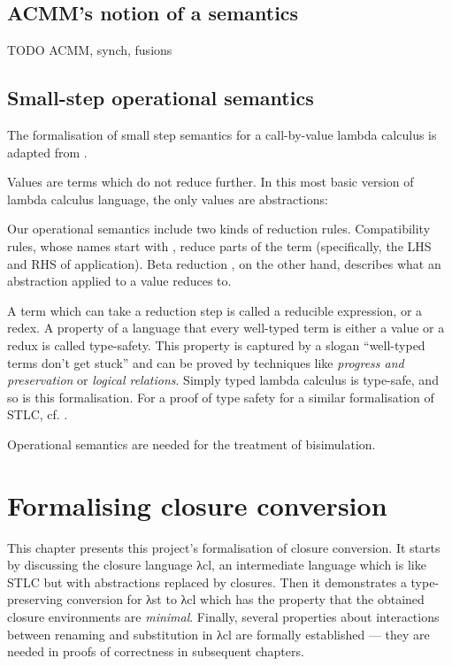 \documentclass[bsc,frontabs,oneside,singlespacing,parskip,deptreport]{infthesis}
\theoremstyle{definition}
\theoremstyle{lemma}
\begin{document}


\section{ACMM's notion of a semantics}

TODO ACMM, synch, fusions

\section{Small-step operational semantics}

The formalisation of small step semantics for a call-by-value lambda
calculus is adapted from \cite{DBLP:conf/sbmf/Wadler18}.

Values are terms which do not reduce further. In this most basic
version of lambda calculus language, the only values are abstractions:


Our operational semantics include two kinds of reduction rules. Compatibility rules, whose
names start with , reduce parts of the term (specifically, the LHS
and RHS of application). Beta reduction , on the other hand,
describes what an abstraction applied to a value reduces to.


A term which can take a reduction step is called a reducible
expression, or a redex. A property of a language that every well-typed
term is either a value or a redux is called type-safety. This property
is captured by a slogan ``well-typed terms don't get stuck'' and can
be proved by techniques like \textit{progress and preservation} or
\textit{logical relations}. Simply typed lambda calculus is type-safe,
and so is this formalisation. For a proof of type safety for a similar
formalisation of STLC, cf. \cite{DBLP:conf/sbmf/Wadler18}.

Operational semantics are needed for the treatment of bisimulation.

\chapter{Formalising closure conversion}
\label{cha:agda-development}

This chapter presents this project's formalisation of closure
conversion. It starts by discussing the closure language λcl, an
intermediate language which is like STLC but with abstractions
replaced by closures. Then it demonstrates a type-preserving
conversion for λst to λcl which has the property that the obtained
closure environments are \textit{minimal}.  Finally, several
properties about interactions between renaming and substitution in λcl
are formally established --- they are needed in proofs of correctness
in subsequent chapters.
\end{document}
